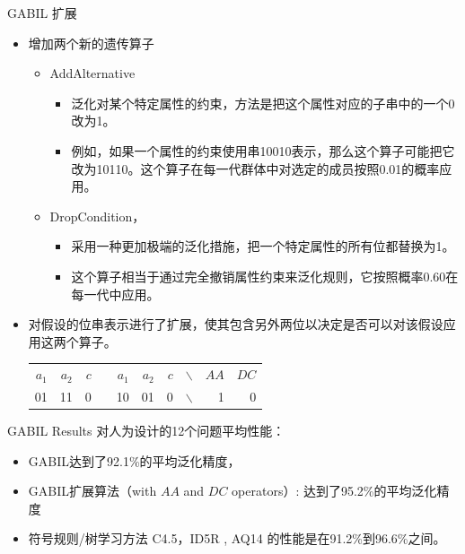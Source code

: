 \documentclass[presentation]{beamer}
\begin{document}
\begin{frame}[label={sec:org3962f55}]{GABIL 扩展}
\begin{itemize}
\item 增加两个新的遗传算子
\begin{itemize}
\item AddAlternative
\begin{itemize}
\item 泛化对某个特定属性的约束，方法是把这个属性对应的子串中的一个0改为1。
\item 例如，如果一个属性的约束使用串10010表示，那么这个算子可能把它改为10110。这个算子在每一代群体中对选定的成员按照0.01的概率应用。
\end{itemize}
\item DropCondition，
\begin{itemize}
\item 采用一种更加极端的泛化措施，把一个特定属性的所有位都替换为1。
\item 这个算子相当于通过完全撤销属性约束来泛化规则，它按照概率0.60在每一代中应用。
\end{itemize}
\end{itemize}
\item 对假设的位串表示进行了扩展，使其包含另外两位以决定是否可以对该假设应用这两个算子。
\begin{center}
\begin{tabular}{rrrlrrrlrr}
\(a_{1}\) & \(a_{2}\) & \(c\) &  & \(a_{1}\) & \(a_{2}\) & \(c\) & $\backslash$ & \(AA\) & \(DC\)\\
01 & 11 & 0 &  & 10 & 01 & 0 & $\backslash$ & 1 & 0\\
\end{tabular}
\end{center}
\end{itemize}
\end{frame}
\begin{frame}[label={sec:org8b0c350}]{GABIL Results}
对人为设计的12个问题平均性能：
\begin{itemize}
\item GABIL达到了92.1\%的平均泛化精度，
\item GABIL扩展算法（with \(AA\) and \(DC\) operators）: 达到了95.2\%的平均泛化精度
\item 符号规则/树学习方法 C4.5，ID5R , AQ14 的性能是在91.2\%到96.6\%之间。
\end{itemize}
\end{frame}
\end{document}
